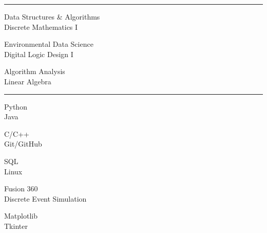 \documentclass[letter]{article}
\begin{document}
    \vspace{4pt}
    \hrule height 1pt
    \vspace{4pt}
    \noindent
    \begin{minipage}[c]{0.415\linewidth}
        \noindent Data Structures \& Algorithms \\
        \noindent Discrete Mathematics I \\
    \end{minipage}
    \begin{minipage}[c]{0.415\linewidth}
        \noindent Environmental Data Science \\
        \noindent Digital Logic Design I \\
    \end{minipage}
    \begin{minipage}[c]{0.415\linewidth}
        \noindent Algorithm Analysis \\
        \noindent Linear Algebra \\
    \end{minipage}

    \vspace{4pt}
    \hrule height 1pt
    \vspace{4pt}
    \noindent
    \begin{minipage}[c]{0.22\linewidth}
        \noindent Python \\
        \noindent Java \\
    \end{minipage}
    \begin{minipage}[c]{0.22\linewidth}
        \noindent C/C++ \\
        \noindent Git/GitHub \\
    \end{minipage}
    \begin{minipage}[c]{0.22\linewidth}
        \noindent SQL \\
        \noindent Linux \\
    \end{minipage}
    \begin{minipage}[c]{0.22\linewidth}
        \noindent Fusion 360 \\
        \noindent Discrete Event Simulation \\
    \end{minipage}
    \begin{minipage}[c]{0.22\linewidth}
        \noindent Matplotlib \\
        \noindent Tkinter \\
    \end{minipage}
\end{document}
